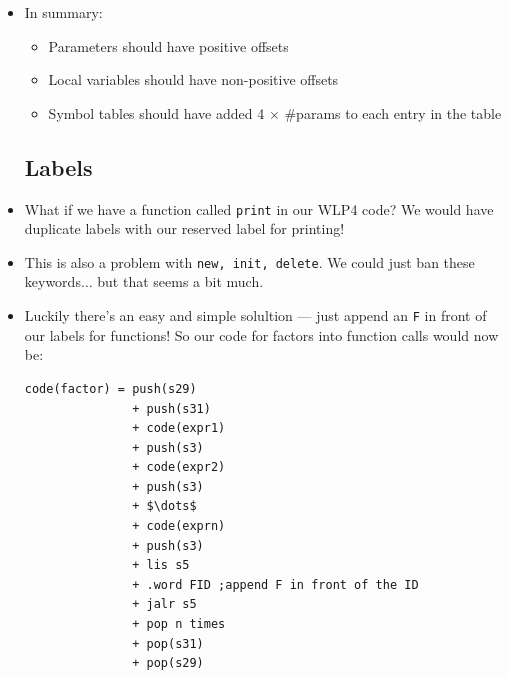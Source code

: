 \documentclass[12pt]{article}
\begin{document}
\begin{itemize}
        \item In summary:
            \begin{itemize}
                \item Parameters should have positive offsets
                \item Local variables should have non-positive offsets
                \item Symbol tables should have added 4 $\times$ \#params to each entry in the table
            \end{itemize}
    \subsection{Labels}
        \item What if we have a function called \lstinline[mathescape]{print} in our WLP4 code?  We would have duplicate labels with our reserved label for printing!
        \item This is also a problem with \lstinline[mathescape]{new, init, delete}.  We could just ban these keywords$\dots$ but that seems a bit much.
        \item Luckily there's an easy and simple solultion --- just append an \lstinline[mathescape]{F} in front of our labels for functions!  So our code for factors into function calls  would now be:
\begin{lstlisting}[mathescape, numbers=none, breaklines=true]
code(factor) = push(s29) 
               + push(s31)
               + code(expr1) 
               + push(s3)
               + code(expr2) 
               + push(s3)
               + $\dots$
               + code(exprn)
               + push(s3)
               + lis s5
               + .word FID ;append F in front of the ID
               + jalr s5
               + pop n times
               + pop(s31) 
               + pop(s29)
\end{lstlisting}

\end{itemize}
\end{document}
